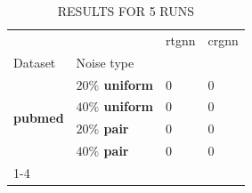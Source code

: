 \begin{table}
\caption{RESULTS FOR 5 RUNS}
\begin{tabular}{llll}
\toprule
 &  & rtgnn & crgnn \\
Dataset & Noise type &  &  \\
\midrule
\multirow[t]{4}{*}{\textbf{pubmed}} & \textbf{$ 20 \% $ uniform} & 0 & 0 \\
\textbf{} & \textbf{$ 40 \% $ uniform} & 0 & 0 \\
\textbf{} & \textbf{$ 20 \% $ pair} & 0 & 0 \\
\textbf{} & \textbf{$ 40 \% $ pair} & 0 & 0 \\
\cline{1-4}
\bottomrule
\end{tabular}
\end{table}
